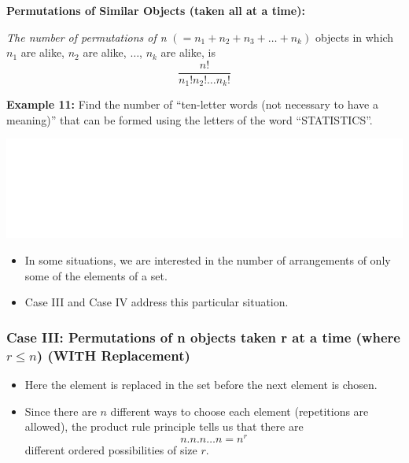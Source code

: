 \documentclass[]{book}
\providecommand{\tightlist}{%
  \setlength{\itemsep}{0pt}\setlength{\parskip}{0pt}}
\begin{document}
\textbf{Permutations of Similar Objects (taken all at a time):}

\emph{The number of permutations of n} \((=n_1 + n_2 + n_3 + \dots + n_k)\) objects in which \(n_1\) are alike, \(n_2\) are alike, \(\dots\), \(n_k\) are alike, is
\[\frac{n!}{n_1!n_2!\dots n_k!}\]

\textbf{Example 11:} Find the number of ``ten-letter words (not necessary to have a meaning)'' that can be formed using the letters of the word ``STATISTICS''.

\begin{center}\includegraphics[width=1\linewidth]{figure/box88-1} \end{center}

\begin{itemize}
\tightlist
\item
  In some situations, we are interested in the number of arrangements of only some of the elements of a set.
\item
  Case III and Case IV address this particular situation.
\end{itemize}

\hypertarget{case-iii-permutations-of-n-objects-taken-r-at-a-time-where-rleq-n-with-replacement}{%
\subsubsection{\texorpdfstring{Case III: Permutations of n objects taken r at a time (where \(r\leq n\)) (WITH Replacement)}{Case III: Permutations of n objects taken r at a time (where r\textbackslash{}leq n) (WITH Replacement)}}\label{case-iii-permutations-of-n-objects-taken-r-at-a-time-where-rleq-n-with-replacement}}

\begin{itemize}
\tightlist
\item
  Here the element is replaced in the set before the next element is chosen.
\item
  Since there are \(n\) different ways to choose each element (repetitions are allowed), the product rule principle tells us that there are
  \[n.n.n\dots n = n^r\]
  different ordered possibilities of size \(r\).
\end{itemize}
\end{document}
